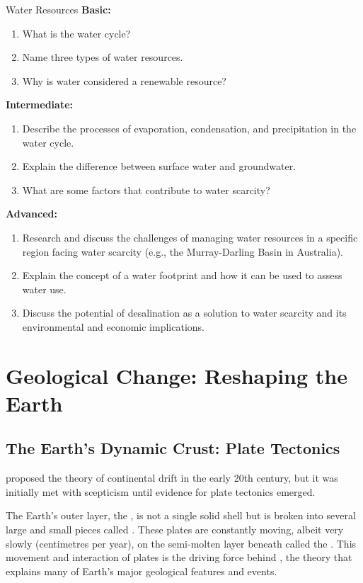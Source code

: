 \begin{tieredquestions}{Water Resources}
\textbf{Basic:}
\begin{enumerate}
    \item What is the water cycle?
    \item Name three types of water resources.
    \item Why is water considered a renewable resource?
\end{enumerate}
\textbf{Intermediate:}
\begin{enumerate}
    \item Describe the processes of evaporation, condensation, and precipitation in the water cycle.
    \item Explain the difference between surface water and groundwater.
    \item What are some factors that contribute to water scarcity?
\end{enumerate}
\textbf{Advanced:}
\begin{enumerate}
    \item Research and discuss the challenges of managing water resources in a specific region facing water scarcity (e.g., the Murray-Darling Basin in Australia).
    \item  Explain the concept of a water footprint and how it can be used to assess water use.
    \item  Discuss the potential of desalination as a solution to water scarcity and its environmental and economic implications.
\end{enumerate}
\end{tieredquestions}


\section{Geological Change: Reshaping the Earth}

\subsection{The Earth's Dynamic Crust: Plate Tectonics}

\begin{marginnote}
 proposed the theory of continental drift in the early 20th century, but it was initially met with scepticism until evidence for plate tectonics emerged.
\end{marginnote}

The Earth's outer layer, the , is not a single solid shell but is broken into several large and small pieces called . These plates are constantly moving, albeit very slowly (centimetres per year), on the semi-molten layer beneath called the . This movement and interaction of plates is the driving force behind , the theory that explains many of Earth's major geological features and events.

